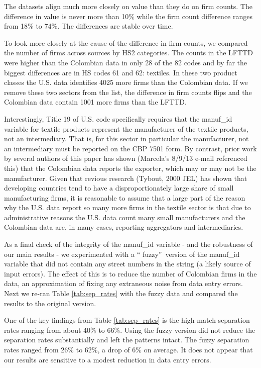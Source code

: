 The datasets align much more closely on value than they do on firm counts.
The difference in value is never more than 10\% while the firm count
difference ranges from 18\% to 74\%. The differences are stable over time.

To look more closely at the cause of the difference in firm counts, we
compared the number of firms across sources by HS2 categories. The counts in
the LFTTD were higher than the Colombian data in only 28 of the 82 codes and
by far the biggest differences are in HS codes 61 and 62: textiles. In these
two product classes the U.S. data identifies 4025 more firms than the
Colombian data. If we remove these two sectors from the list, the difference
in firm counts flips and the Colombian data contain 1001 more firms than the
LFTTD.

Interestingly, Title 19 of U.S. code specifically requires that the
manuf\_id variable for textile products represent the manufacturer of the
textile products, not an intermediary. That is, for this sector in
particular the manufacturer, not an intermediary must be reported on the CBP
7501 form. By contrast, prior work by several authors of this paper has
shown (Marcela's 8/9/13 e-mail referenced this) that the Colombian data
reports the exporter, which may or may not be the manufacturer. Given that
revious research (Tybout, 2000 JEL) has shown that developing countries tend
to have a disproportionately large share of small manufacturing firms, it is
reasonable to assume that a large part of the reason why the U.S. data
report so many more firms in the textile sector is that due to
administrative reasons the U.S. data count many small manufacturers and the
Colombian data are, in many cases, reporting aggregators and intermediaries.

As a final check of the integrity of the manuf\_id variable - and the
robustness of our main results - we experimented with a \textquotedblleft
fuzzy\textquotedblright\ version of the manuf\_id variable that did not
contain any street numbers in the string (a likely source of input errors).
The effect of this is to reduce the number of Colombian firms in the data,
an approximation of fixing any extraneous noise from data entry errors. Next
we re-ran Table \ref{tab:sep_rates} with the fuzzy data and compared the results to the
original version.

One of the key findings from Table \ref{tab:sep_rates} is the high match separation rates
ranging from about 40\% to 66\%. Using the fuzzy version did not reduce the
separation rates substantially and left the patterns intact. The fuzzy
separation rates ranged from 26\% to 62\%, a drop of 6\% on average. It does
not appear that our results are sensitive to a modest reduction in data
entry errors.
 
